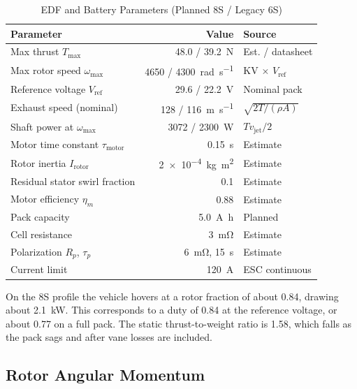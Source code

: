 \documentclass[conference]{IEEEtran}
\begin{document}
\begin{table}[htbp]
\caption{EDF and Battery Parameters (Planned 8S / Legacy 6S)}
\label{tab:edf_params}
\centering
\footnotesize
\setlength{\tabcolsep}{2.5pt}
\begin{tabular}{lrl}
\toprule
\textbf{Parameter} & \textbf{Value} & \textbf{Source} \\
\midrule
Max thrust $T_{\max}$ & 48.0 / \SI{39.2}{\newton} & Est. / datasheet \\
Max rotor speed $\omega_{\max}$ & 4650 / \SI{4300}{\radian\per\second} & KV $\times$ $V_{\text{ref}}$ \\
Reference voltage $V_{\text{ref}}$ & 29.6 / \SI{22.2}{\volt} & Nominal pack \\
Exhaust speed (nominal) & 128 / \SI{116}{\metre\per\second} & $\sqrt{2T/(\rho A)}$ \\
Shaft power at $\omega_{\max}$ & 3072 / \SI{2300}{\watt} & $T v_{\text{jet}}/2$ \\
Motor time constant $\tau_{\text{motor}}$ & \SI{0.15}{\second} & Estimate \\
Rotor inertia $I_{\text{rotor}}$ & \SI{2e-4}{\kilogram\metre\squared} & Estimate \\
Residual stator swirl fraction & 0.1 & Estimate \\
Motor efficiency $\eta_m$ & 0.88 & Estimate \\
Pack capacity & \SI{5.0}{\ampere\hour} & Planned \\
Cell resistance & \SI{3}{\milli\ohm} & Estimate \\
Polarization $R_p$, $\tau_p$ & \SI{6}{\milli\ohm}, \SI{15}{\second} & Estimate \\
Current limit & \SI{120}{\ampere} & ESC continuous \\
\bottomrule
\end{tabular}
\end{table}

On the 8S profile the vehicle hovers at a rotor fraction of about 0.84, drawing about \SI{2.1}{\kilo\watt}. This corresponds to a duty of 0.84 at the reference voltage, or about 0.77 on a full pack. The static thrust-to-weight ratio is 1.58, which falls as the pack sags and after vane losses are included.

\subsection{Rotor Angular Momentum}
\label{sec:rotor_momentum}
\end{document}
